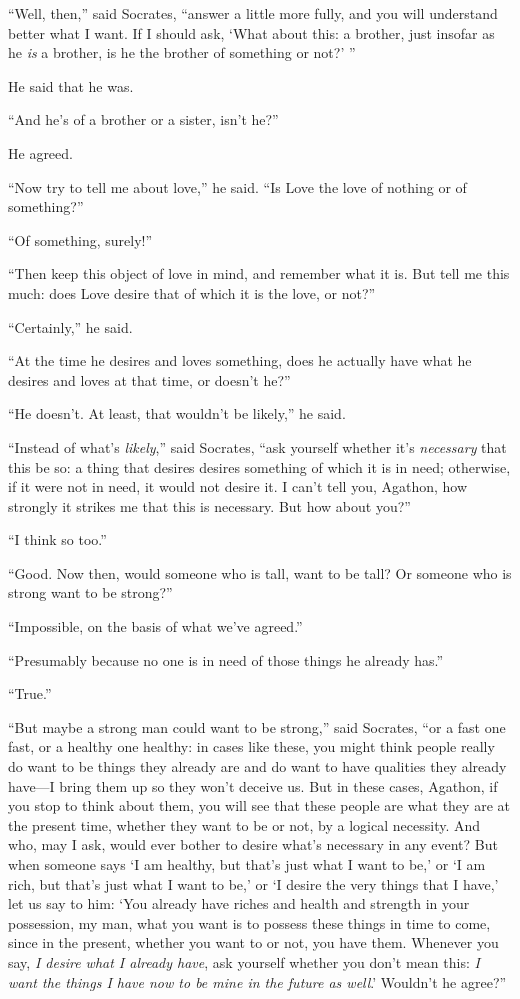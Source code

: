 “Well, then,” said Socrates, “answer a little more fully, and you will
understand better what I want. If I should ask, ‘What about this: a
brother, just insofar as he {\em is} a brother, is he the brother of
something or not?' ”

He said that he was.

“And he's of a brother or a sister, isn't he?”

He agreed.

“Now try to tell me about love,” he said. “Is Love the love of nothing
or of something?”

 “Of something, surely!”

“Then keep this object of love in mind, and remember what it
is. But tell me this
much: does Love desire that of which it is the love, or not?”

“Certainly,” he said.

“At the time he desires and loves something, does he actually have what
he desires and loves at that time, or doesn't he?”

“He doesn't. At least, that wouldn't be likely,” he said.

“Instead of what's {\em likely},” said Socrates, “ask yourself whether
it's {\em necessary}  that this be so: a thing that desires
desires something of which it is in need; otherwise, if it were not in
need, it would not desire it. I can't tell you, Agathon, how strongly it
strikes me that this is necessary. But how about you?”

“I think so too.”

“Good. Now then, would someone who is tall, want to be tall? Or someone
who is strong want to be strong?”

“Impossible, on the basis of what we've agreed.”

“Presumably because no one is in need of those things he already has.”

“True.”

“But maybe a strong man could want to be strong,” said Socrates, “or a
fast one fast, or a healthy one healthy: in cases like these, you might
 think people really do want to be things they already are and do
want to have qualities they already have---I bring them up so they won't
deceive us. But in these cases, Agathon, if you stop to think about
them, you will see that these people are what they are at the present
time, whether they want to be or not, by a logical necessity. And who,
may I ask, would ever bother to desire what's necessary in any event?
But when someone says ‘I am healthy, but that's just what I want to be,'
or ‘I am rich, but that's just what I want to be,' or ‘I desire the very
things that I have,' let us say  to him: ‘You already have riches
and health and strength in your possession, my man, what you want is to
possess these things in time to come, since in the present, whether you
want to or not, you have them. Whenever you say, {\em I desire what I
already have}, ask yourself whether you don't mean this: {\em I want the
things I have now to be mine in the future as well}.' Wouldn't he
agree?”

